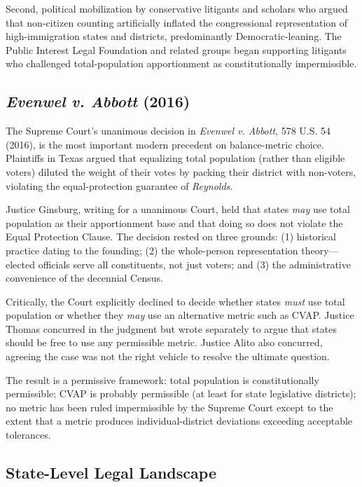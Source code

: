 Second, political mobilization by conservative litigants and scholars who argued that non-citizen counting artificially inflated the congressional representation of high-immigration states and districts, predominantly Democratic-leaning. The Public Interest Legal Foundation and related groups began supporting litigants who challenged total-population apportionment as constitutionally impermissible.

\subsection{\emph{Evenwel v. Abbott} (2016)}

The Supreme Court's unanimous decision in \emph{Evenwel v. Abbott}, 578 U.S. 54 (2016), is the most important modern precedent on balance-metric choice. Plaintiffs in Texas argued that equalizing total population (rather than eligible voters) diluted the weight of their votes by packing their district with non-voters, violating the equal-protection guarantee of \emph{Reynolds}.

Justice Ginsburg, writing for a unanimous Court, held that states \emph{may} use total population as their apportionment base and that doing so does not violate the Equal Protection Clause. The decision rested on three grounds: (1) historical practice dating to the founding; (2) the whole-person representation theory---elected officials serve all constituents, not just voters; and (3) the administrative convenience of the decennial Census.

Critically, the Court explicitly declined to decide whether states \emph{must} use total population or whether they \emph{may} use an alternative metric such as CVAP. Justice Thomas concurred in the judgment but wrote separately to argue that states should be free to use any permissible metric. Justice Alito also concurred, agreeing the case was not the right vehicle to resolve the ultimate question.

The result is a permissive framework: total population is constitutionally permissible; CVAP is probably permissible (at least for state legislative districts); no metric has been ruled impermissible by the Supreme Court except to the extent that a metric produces individual-district deviations exceeding acceptable tolerances.

\subsection{State-Level Legal Landscape}

